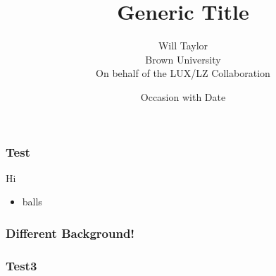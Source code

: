 \documentclass[20pt]{beamer}
\title[Generic Title]{Generic Title}
\date{Occasion with Date}
\author{Will Taylor \\
        Brown University \\
        On behalf of the LUX/LZ Collaboration}
\begin{document}
\begin{frame}
\titlepage
\end{frame}

\begin{frame}
    \frametitle{Test}
    Hi
    \begin{itemize}
        \item{balls}
    \end{itemize}
\end{frame}

{

\begin{frame}
    \frametitle{Different Background!}
\end{frame}
}

\begin{frame}
\frametitle{Test3}

\end{frame}
\end{document}
